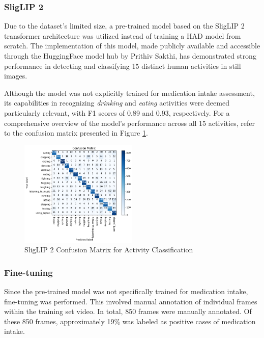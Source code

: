 \documentclass[a4paper,12pt]{article}
\begin{document}
\subsubsection{SligLIP 2}
Due to the dataset's limited size, a pre-trained model based on the SligLIP 2
transformer architecture was utilized instead of training a HAD model from scratch.
The implementation of this model, made publicly available and accessible through the
HuggingFace model hub by Prithiv Sakthi, has demonstrated strong performance
in detecting and classifying 15 distinct human activities in still images.

Although the model was not explicitly trained for medication intake assessment, its
capabilities in recognizing \textit{drinking} and \textit{eating} activities were
deemed particularly relevant, with F1 scores of 0.89 and 0.93, respectively. For a
comprehensive overview of the model's performance across all 15 activities, refer to
the confusion matrix presented in Figure
\ref{fig:HAD-cm}.

\begin{figure}[H]
    \centering
    \includegraphics[width=0.5\textwidth]{./images/conf matrix had.png} 
    \caption{SligLIP 2 Confusion Matrix for Activity Classification}
    \label{fig:HAD-cm}
\end{figure}

\subsubsection{Fine-tuning}
Since the pre-trained model was not specifically trained for medication intake, fine-tuning was performed. This 
involved manual annotation of individual frames within the training set video. In total, 850 frames  were manually
annotated. Of these 850  frames, approximately 19\% was labeled as positive cases of medication intake.
\end{document}
